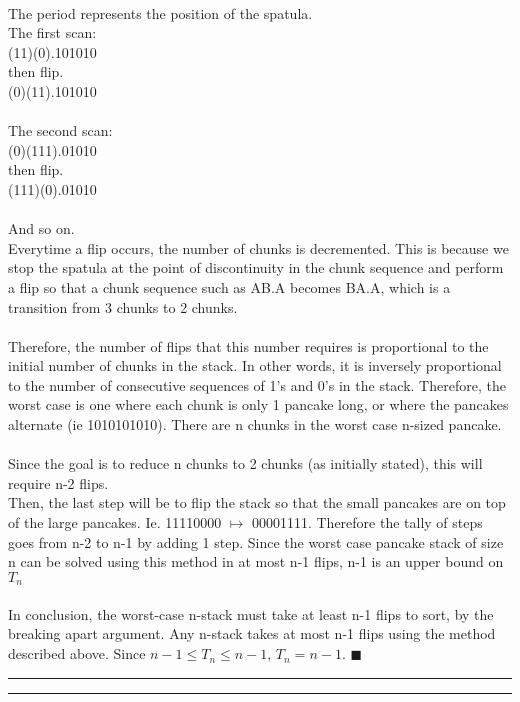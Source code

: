 \documentclass[11pt,letterpaper]{article}
\newcommand{\question}[2] {\vspace{.25in} \hrule\vspace{0.5em}
\noindent{\bf #1: #2} \vspace{0.5em}
\hrule \vspace{.10in}}
\begin{document}
\\
The period represents the position of the spatula. \\
The first scan:\\
(11)(0).101010\\
then flip.\\
(0)(11).101010\\
\\
The second scan:\\
(0)(111).01010\\
then flip. \\
(111)(0).01010\\
\\
And so on.
\\
Everytime a flip occurs, the number of chunks is decremented. This is because we stop the spatula at the point of discontinuity in the chunk sequence and perform a flip so that a chunk sequence such as AB.A becomes BA.A, which is a transition from 3 chunks to 2 chunks.\\
\\
Therefore, the number of flips that this number requires is proportional to the initial number of chunks in the stack. In other words, it is inversely proportional to the number of consecutive sequences of 1's and 0's in the stack. Therefore, the worst case is one where each chunk is only 1 pancake long, or where the pancakes alternate (ie 1010101010). There are n chunks in the worst case n-sized pancake.\\
\\
Since the goal is to reduce n chunks to 2 chunks (as initially stated), this will require n-2 flips.
\\
Then, the last step will be to flip the stack so that the small pancakes are on top of the large pancakes. Ie. 11110000 $\mapsto$ 00001111. Therefore the tally of steps goes from n-2 to n-1 by adding 1 step. Since the worst case pancake stack of size n can be solved using this method in at most n-1 flips, n-1 is an upper bound on $T_n$\\
\\
In conclusion, the worst-case n-stack must take at least n-1 flips to sort, by the breaking apart argument. Any n-stack takes at most n-1 flips using the method described above. Since $n-1 \leq T_n \leq n-1$, $T_n = n-1$. $\blacksquare$

\question{5}{The Ghost of Puzzle Hunts Past}
\end{document}

